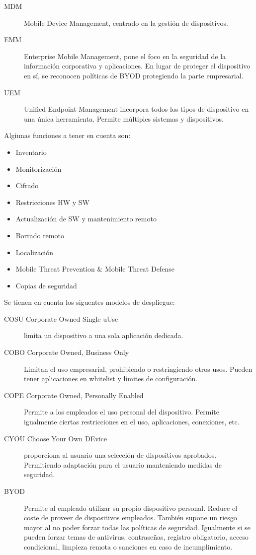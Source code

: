 \begin{description}
    \item[MDM] Mobile Device Management, centrado en la gestión de dispositivos.
    \item[EMM] Enterprise Mobile Management, pone el foco en la seguridad de la información corporativa y aplicaciones. En lugar de proteger el dispositivo en sí, se reconocen políticas de BYOD protegiendo la parte empresarial.
    \item[UEM] Unified Endpoint Management incorpora todos los tipos de dispositivo en una única herramienta. Permite múltiples sistemas y dispositivos.
\end{description}

Algiunas funciones a tener en cuenta son:
\begin{itemize}
    \item Inventario
    \item Monitorización
    \item Cifrado
    \item Restricciones HW y SW
    \item Actualización de SW y mantenimiento remoto
    \item Borrado remoto
    \item Localización
    \item Mobile Threat Prevention \& Mobile Threat Defense
    \item Copias de seguridad
\end{itemize}

Se tienen en cuenta los siguentes modelos de despliegue:
\begin{description}
    \item[COSU Corporate Owned Single uUse] limita un dispositivo a una sola aplicación dedicada.
    \item[COBO Corporate Owned, Business Only] Limitan el uso empresarial, prohibiendo o restringiendo otros usos. Pueden tener aplicaciones en whitelist y límites de configuración.
    \item[COPE Corporate Owned, Personally Enabled] Permite a los empleados el uso personal del dispositivo. Permite igualmente ciertas restricciones en el uso, aplicaciones, conexiones, etc.
    \item[CYOU Choose Your Own DEvice] proporciona al usuario una selección de dispositivos aprobados. Permitiendo adaptación para el usuario manteniendo medidas de seguridad.
    \item[BYOD] Permite al empleado utilizar su propio dispositivo personal. Reduce el coste de proveer de dispositivos empleados. También supone un riesgo mayor al no poder forzar todas las políticas de seguridad. Igualmente si se pueden forzar temas de antivirus, contraseñas, registro obligatorio, acceso condicional, limpieza remota o sanciones en caso de incumplimiento.
\end{description}

